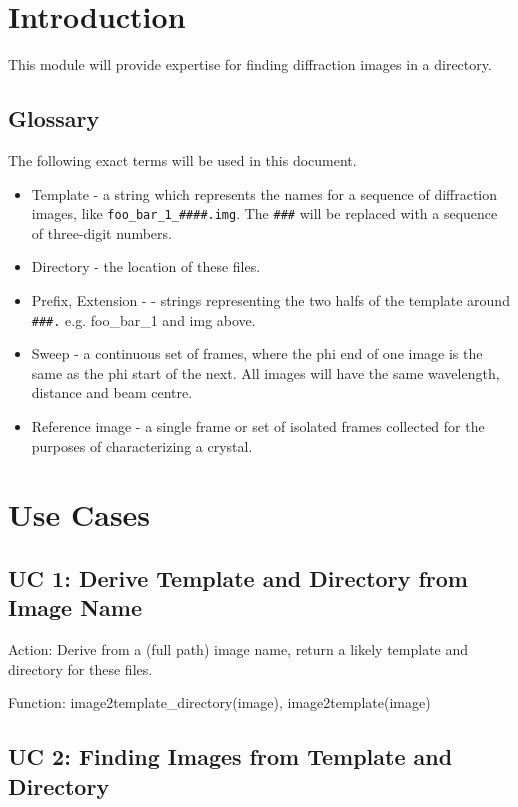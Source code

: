 \documentclass[a4paper, 11pt]{article}
\begin{document}
\section{Introduction}

This module will provide expertise for finding diffraction images in a
directory. 

\subsection{Glossary}

The following exact terms will be used in this document.

\begin{itemize}
\item{Template - a string which represents the names for a sequence of
diffraction images, like \verb|foo_bar_1_####.img|. The \verb|###| will
be replaced with a sequence of three-digit numbers.}
\item{Directory - the location of these files.}
\item{Prefix, Extension - - strings representing the two halfs of the 
template around \verb|###.| e.g. foo\_bar\_1 and img above.}
\item{Sweep - a continuous set of frames, where the phi end of one
image is the same as the phi start of the next. All images will have 
the same wavelength, distance and beam centre.}
\item{Reference image - a single frame or set of isolated frames collected 
for the purposes of characterizing a crystal.}
\end{itemize}

\section{Use Cases}

\subsection{UC 1: Derive Template and Directory from Image Name}

Action: Derive from a (full path) image name, return a likely template and
directory for these files. 

Function: image2template\_directory(image), image2template(image)

\subsection{UC 2: Finding Images from Template and Directory}
\end{document}
